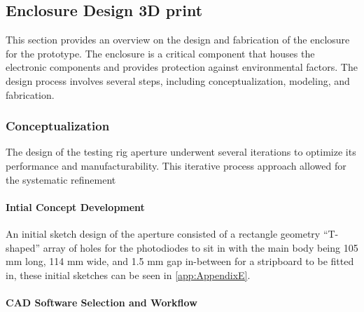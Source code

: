 \subsection{Enclosure Design 3D print}  %
\label{subsec:enclosureDesign}
This section provides an overview on the design and fabrication of the enclosure for the prototype. 
The enclosure is a critical component that houses the electronic components and provides protection against environmental factors. 
The design process involves several steps, including conceptualization, modeling, and fabrication.


\subsubsection{Conceptualization}
The design of the testing rig aperture underwent several iterations to optimize its performance and manufacturability. 
This iterative process approach allowed for the systematic refinement

\paragraph{Intial Concept Development}

An initial sketch design of the aperture consisted of a rectangle geometry “T-shaped” array of holes for the photodiodes to sit in with the main body being 105 mm long, 114 mm wide, and 1.5 mm gap in-between for a stripboard to be fitted in, these initial sketches can be seen in \ref{app:AppendixE}.

\paragraph{CAD Software Selection and Workflow} 

